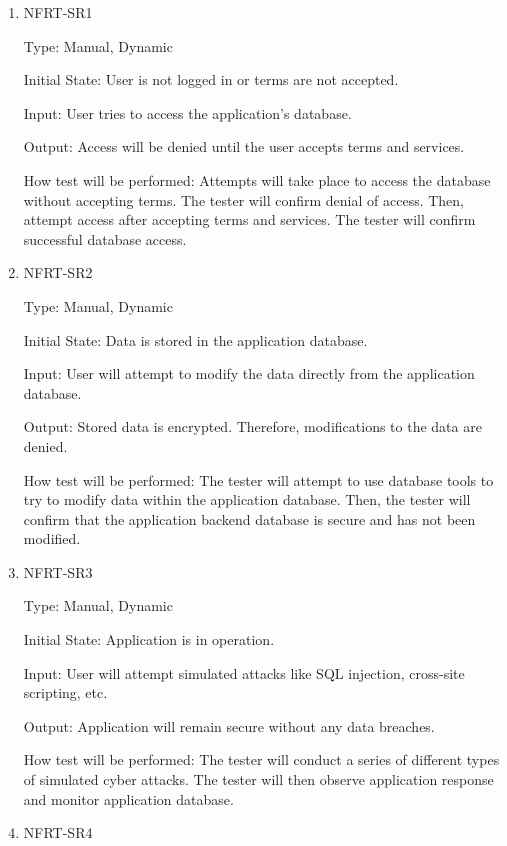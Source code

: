 \documentclass[12pt, titlepage]{article}
\begin{document}
\begin{enumerate}
\item{NFRT-SR1\\}

Type: Manual, Dynamic

Initial State: User is not logged in or terms are not accepted.
                
Input: User tries to access the application's database.
                
Output: Access will be denied until the user accepts terms and services.
                
How test will be performed: Attempts will take place to access the database without accepting terms. The tester will confirm denial of access. Then, attempt access after accepting terms and services. The tester will confirm successful database access.

\item{NFRT-SR2\\}

Type: Manual, Dynamic

Initial State: Data is stored in the application database.
                
Input: User will attempt to modify the data directly from the application database.
                
Output: Stored data is encrypted. Therefore, modifications to the data are denied.
                
How test will be performed: The tester will attempt to use database tools to try to modify data within the application database. Then, the tester will confirm that the application backend database is secure and has not been modified.

\item{NFRT-SR3\\}

Type: Manual, Dynamic

Initial State: Application is in operation.
                
Input: User will attempt simulated attacks like SQL injection, cross-site scripting, etc.
                
Output: Application will remain secure without any data breaches.
                
How test will be performed: The tester will conduct a series of different types of simulated cyber attacks. The tester will then observe application response and monitor application database.

\item{NFRT-SR4\\}


\end{enumerate}
\end{document}
